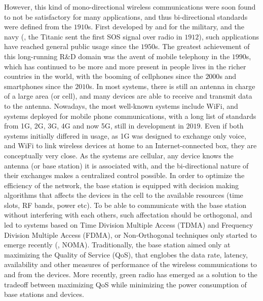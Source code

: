 However, this kind of mono-directional wireless communications were soon found to not be satisfactory for many applications, and thus bi-directional standards were defined from the $1910$s.
First developed by and for the military, and the navy (\eg, the Titanic sent the first SOS signal over radio in $1912$),
such applications have reached general public usage since the $1950$s.
The greatest achievement of this long-running R\&D domain was the avent of mobile telephony in the $1990$s, which has continued to be more and more present in people lives in the richer countries in the world, with the booming of cellphones since the $2000$s and smartphones since the $2010$s.
In most systems, there is still an antenna in charge of a large area (or cell), and many devices are able to receive and transmit data to the antenna.
Nowadays, the most well-known systems include WiFi, and systems deployed for mobile phone communications, with a long list of standards from 1G, 2G, 3G, 4G and now 5G, still in development in $2019$.
Even if both systems initially differed in usage, as 1G was designed to exchange only voice, and WiFi to link wireless devices at home to an Internet-connected box, they are conceptually very close.
As the systems are cellular, any device knows the antenna (or base station) it is associated with, and the bi-directional nature of their exchanges makes a centralized control possible.
In order to optimize the efficiency of the network, the base station is equipped with decision making algorithms that affects the devices in the cell to the available resources (time slots, RF bands, power etc).
To be able to communicate with the base station without interfering with each others, such affectation should be orthogonal, and led to systems based on Time Division Multiple Access (TDMA) and Frequency Division Multiple Access (FDMA), or Non-Orthogonal techniques only started to emerge recently (\eg, NOMA).
Traditionally, the base station aimed only at maximizing the Quality of Service (QoS), that englobes the data rate, latency, availability and other measures of performance of the wireless communications to and from the devices.
More recently, green radio has emerged as a solution to the tradeoff between maximizing QoS while minimizing the power consumption of base stations and devices.

